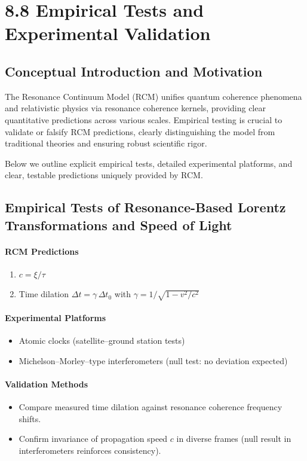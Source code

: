 \section{8.8 Empirical Tests and Experimental Validation}

\subsection{Conceptual Introduction and Motivation}

The Resonance Continuum Model (RCM) unifies quantum coherence phenomena and relativistic physics via resonance coherence kernels, providing clear quantitative predictions across various scales. Empirical testing is crucial to validate or falsify RCM predictions, clearly distinguishing the model from traditional theories and ensuring robust scientific rigor.

Below we outline explicit empirical tests, detailed experimental platforms, and clear, testable predictions uniquely provided by RCM.

\subsection{Empirical Tests of Resonance-Based Lorentz Transformations and Speed of Light}

\paragraph{RCM Predictions}
\begin{enumerate}
  \item $c = \xi/\tau$\label{eq:c_xi_tau}
  \item Time dilation $\Delta t = \gamma\,\Delta t_0$ with $\gamma=1/\sqrt{1-v^2/c^2}$
\end{enumerate}

\paragraph{Experimental Platforms}
\begin{itemize}
  \item Atomic clocks (satellite–ground station tests)  
  \item Michelson–Morley–type interferometers (null test: no deviation expected)\label{null:mm}
\end{itemize}

\paragraph{Validation Methods}
\begin{itemize}
  \item Compare measured time dilation against resonance coherence frequency shifts.  
  \item Confirm invariance of propagation speed $c$ in diverse frames (null result in interferometers reinforces consistency).  
\end{itemize}

